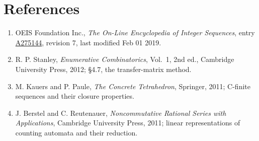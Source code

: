 \documentclass[11pt]{article}
\theoremstyle{definition}
\begin{document}
\section{References}

\begin{enumerate}

\item OEIS Foundation Inc., \emph{The On-Line Encyclopedia of Integer Sequences}, entry \href{https://oeis.org/A275144}{A275144}, revision 7, last modified Feb 01 2019.

\item R. P. Stanley, \emph{Enumerative Combinatorics}, Vol.~1, 2nd ed., Cambridge University Press, 2012; \S4.7, the transfer-matrix method.

\item M. Kauers and P. Paule, \emph{The Concrete Tetrahedron}, Springer, 2011; C-finite sequences and their closure properties.

\item J. Berstel and C. Reutenauer, \emph{Noncommutative Rational Series with Applications}, Cambridge University Press, 2011; linear representations of counting automata and their reduction.

\end{enumerate}
\end{document}
